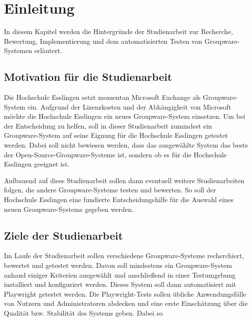 \chapter{Einleitung}

In diesem Kapitel werden die Hintergründe der Studienarbeit zur Recherche, Bewertung, Implementierung und dem automatisierten Testen von Groupware-Systemen erläutert.

\section{Motivation für die Studienarbeit}

Die Hochschule Esslingen setzt momentan Microsoft Exchange als Groupware-System ein.
Aufgrund der Lizenzkosten und der Abhängigkeit von Microsoft möchte die Hochschule Esslingen ein neues Groupware-System einsetzen.
Um bei der Entscheidung zu helfen, soll in dieser Studienarbeit zumindest ein Groupware-System auf seine Eignung für die Hochschule Esslingen getestet werden.
Dabei soll nicht bewiesen werden, dass das ausgewählte System das beste der Open-Source-Groupware-Systeme ist, sondern ob es für die Hochschule Esslingen geeignet ist.

Aufbauend auf diese Studienarbeit sollen dann eventuell weitere Studienarbeiten folgen, die andere Groupware-Systeme testen und bewerten.
So soll der Hochschule Esslingen eine fundierte Entscheidungshilfe für die Auswahl eines neuen Groupware-Systems gegeben werden.



\section{Ziele der Studienarbeit}

Im Laufe der Studienarbeit sollen verschiedene Groupware-Systeme recherchiert, bewertet und getestet werden.
Davon soll mindestens ein Groupware-System anhand einiger Kriterien ausgewählt und anschließend in einer Testumgebung installiert und konfiguriert werden.
Dieses System soll dann automatisiert mit Playwright getestet werden.
Die Playwright-Tests sollen übliche Anwendungsfälle von Nutzern und Administratoren abdecken und eine erste Einschätzung über die Qualität bzw. Stabilität des Systems geben.
Dabei so


